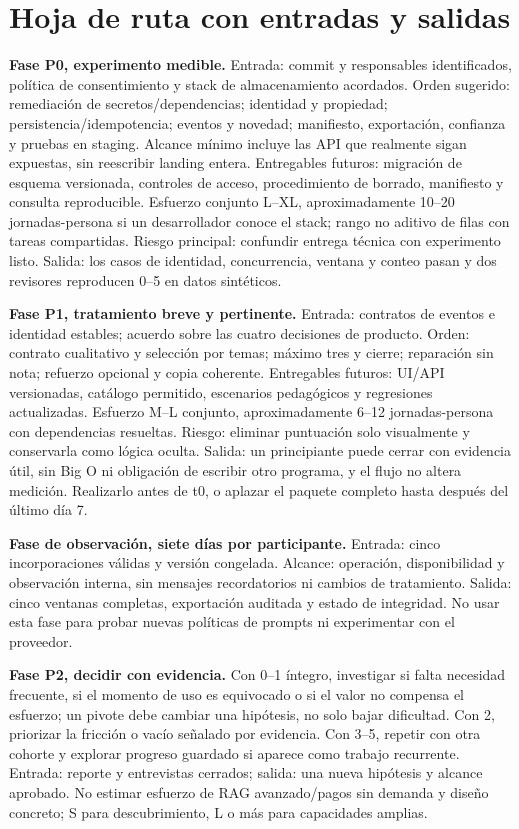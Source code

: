 \documentclass[11pt,a4paper]{report}
\begin{document}
\section{Hoja de ruta con entradas y salidas}
\textbf{Fase P0, experimento medible.} Entrada: commit y responsables identificados, política de consentimiento y stack de almacenamiento acordados. Orden sugerido: remediación de secretos/dependencias; identidad y propiedad; persistencia/idempotencia; eventos y novedad; manifiesto, exportación, confianza y pruebas en staging. Alcance mínimo incluye las API que realmente sigan expuestas, sin reescribir landing entera. Entregables futuros: migración de esquema versionada, controles de acceso, procedimiento de borrado, manifiesto y consulta reproducible. Esfuerzo conjunto L--XL, aproximadamente 10--20 jornadas-persona si un desarrollador conoce el stack; rango no aditivo de filas con tareas compartidas. Riesgo principal: confundir entrega técnica con experimento listo. Salida: los casos de identidad, concurrencia, ventana y conteo pasan y dos revisores reproducen 0--5 en datos sintéticos.

\textbf{Fase P1, tratamiento breve y pertinente.} Entrada: contratos de eventos e identidad estables; acuerdo sobre las cuatro decisiones de producto. Orden: contrato cualitativo y selección por temas; máximo tres y cierre; reparación sin nota; refuerzo opcional y copia coherente. Entregables futuros: UI/API versionadas, catálogo permitido, escenarios pedagógicos y regresiones actualizadas. Esfuerzo M--L conjunto, aproximadamente 6--12 jornadas-persona con dependencias resueltas. Riesgo: eliminar puntuación solo visualmente y conservarla como lógica oculta. Salida: un principiante puede cerrar con evidencia útil, sin Big O ni obligación de escribir otro programa, y el flujo no altera medición. Realizarlo antes de t0, o aplazar el paquete completo hasta después del último día 7.

\textbf{Fase de observación, siete días por participante.} Entrada: cinco incorporaciones válidas y versión congelada. Alcance: operación, disponibilidad y observación interna, sin mensajes recordatorios ni cambios de tratamiento. Salida: cinco ventanas completas, exportación auditada y estado de integridad. No usar esta fase para probar nuevas políticas de prompts ni experimentar con el proveedor.

\textbf{Fase P2, decidir con evidencia.} Con 0--1 íntegro, investigar si falta necesidad frecuente, si el momento de uso es equivocado o si el valor no compensa el esfuerzo; un pivote debe cambiar una hipótesis, no solo bajar dificultad. Con 2, priorizar la fricción o vacío señalado por evidencia. Con 3--5, repetir con otra cohorte y explorar progreso guardado si aparece como trabajo recurrente. Entrada: reporte y entrevistas cerrados; salida: una nueva hipótesis y alcance aprobado. No estimar esfuerzo de RAG avanzado/pagos sin demanda y diseño concreto; S para descubrimiento, L o más para capacidades amplias.
\end{document}
